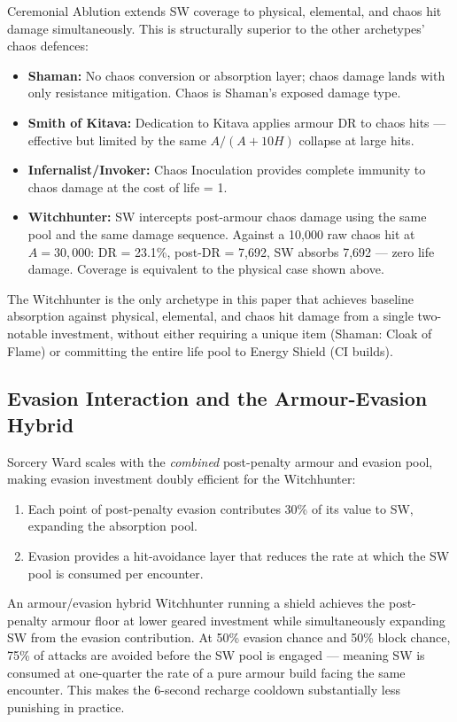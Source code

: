 \documentclass[12pt, letterpaper]{article}
\begin{document}
Ceremonial Ablution extends SW coverage to physical, elemental, and chaos hit damage simultaneously. This is structurally superior to the other archetypes' chaos defences:

\begin{itemize}
    \item \textbf{Shaman:} No chaos conversion or absorption layer; chaos damage lands with only resistance mitigation. Chaos is Shaman's exposed damage type.
    \item \textbf{Smith of Kitava:} Dedication to Kitava applies armour DR to chaos hits --- effective but limited by the same $A/(A+10H)$ collapse at large hits.
    \item \textbf{Infernalist/Invoker:} Chaos Inoculation provides complete immunity to chaos damage at the cost of life = 1.
    \item \textbf{Witchhunter:} SW intercepts post-armour chaos damage using the same pool and the same damage sequence. Against a 10{,}000 raw chaos hit at $A = 30{,}000$: DR = 23.1\%, post-DR = 7{,}692, SW absorbs 7{,}692 --- zero life damage. Coverage is equivalent to the physical case shown above.
\end{itemize}

The Witchhunter is the only archetype in this paper that achieves baseline absorption against physical, elemental, and chaos hit damage from a single two-notable investment, without either requiring a unique item (Shaman: Cloak of Flame) or committing the entire life pool to Energy Shield (CI builds).

\subsection*{Evasion Interaction and the Armour-Evasion Hybrid}

Sorcery Ward scales with the \textit{combined} post-penalty armour and evasion pool, making evasion investment doubly efficient for the Witchhunter:

\begin{enumerate}
    \item Each point of post-penalty evasion contributes 30\% of its value to SW, expanding the absorption pool.
    \item Evasion provides a hit-avoidance layer that reduces the rate at which the SW pool is consumed per encounter.
\end{enumerate}

An armour/evasion hybrid Witchhunter running a shield achieves the post-penalty armour floor at lower geared investment while simultaneously expanding SW from the evasion contribution. At 50\% evasion chance and 50\% block chance, 75\% of attacks are avoided before the SW pool is engaged --- meaning SW is consumed at one-quarter the rate of a pure armour build facing the same encounter. This makes the 6-second recharge cooldown substantially less punishing in practice.
\end{document}
